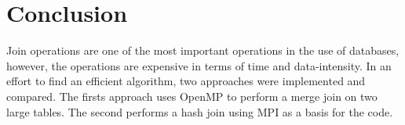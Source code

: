 \documentclass[journal,draftclsnofoot,11pt]{IEEEtran}
\begin{document}
\section{Conclusion}\label{conc}
Join operations are one of the most important operations in the use of databases, however, the operations are expensive in terms of time and data-intensity. In an effort to find an efficient algorithm, two approaches were implemented and compared. The firsts approach uses OpenMP to perform a merge join on two large tables. The second performs a hash join using MPI as a basis for the code.


\cleardoublepage
\onecolumn
\end{document}
